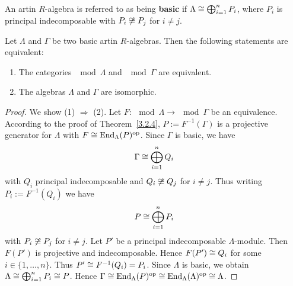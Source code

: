 
\begin{definition}
  An artin $R$-algebra is referred to as being \textbf{basic} if $\Lambda \cong \bigoplus_{i=1}^n
  P_i$, where $P_i$ is principal indecomposable with $P_i \not\cong P_j$ for $i \neq j$.
\end{definition}


\begin{corollary}\label{3.2.6}
  Let $\Lambda$ and $\Gamma$ be two basic artin $R$-algebras. Then the following statements
  are equivalent:
  \begin{enumerate}
  \item The categories $\mod{\Lambda}$ and $\mod{\Gamma}$ are equivalent.
  \item The algebras $\Lambda$ and $\Gamma$ are isomorphic.
  \end{enumerate}
\end{corollary}
\begin{proof} We show (1) $\Rightarrow$ (2). Let $F : \mod{\Lambda} \to \mod{\Gamma}$ be an equivalence. According to the
  proof of Theorem~\ref{3.2.4}, $P := F^{-1}(\Gamma)$ is a projective generator for $\Lambda$ with
  $F \cong \operatorname{End}_\Lambda(P)^{\mathrm{op}}$.
  Since $\Gamma$ is basic, we have
    \[ \Gamma \cong \bigoplus_{i=1}^n Q_i \]
  with $Q_i$ principal indecomposable and $Q_i \not\cong Q_j$ for $i \neq j$.
  Thus writing $P_i := F^{-1}(Q_i)$ we have
  \[
  P \cong \bigoplus_{i=1}^n P_i
  \]
  with $P_i \not\cong P_j$ for
  $i \neq j$. Let $P'$ be a principal indecomposable $\Lambda$-module. Then $F(P')$ is
  projective and indecomposable.
  Hence $F(P') \cong Q_i$ for some $i \in \{1, \ldots, n\}$. Thus $P' \cong F^{-1}(Q_i) = P_i$.
  Since $\Lambda$ is basic, we obtain $\Lambda \cong \bigoplus_{i=1}^n P_i \cong P$. Hence $\Gamma
  \cong \operatorname{End}_\Lambda(P)^{\mathrm{op}} \cong \operatorname{End}_\Lambda(\Lambda)^{\mathrm{op}} \cong \Lambda$.
\end{proof}

